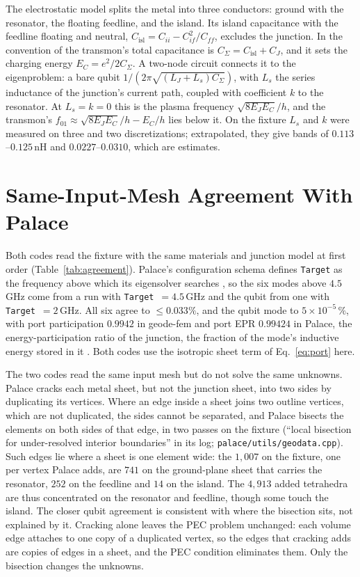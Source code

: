 \documentclass{anvil-paper}
\newcommand{\Cisl}{C_{\mathrm{isl}}}
\begin{document}
The electrostatic model splits the metal into three conductors: ground
with the resonator, the floating feedline, and the island. Its island
capacitance with the feedline floating and neutral,
$\Cisl = C_{ii} - C_{if}^2/C_{ff}$, excludes the junction. In the
convention of \citet{koch2007charge} the transmon's total capacitance is
$C_\Sigma = \Cisl + C_J$, and it sets the charging energy $E_C =
e^2/2C_\Sigma$. A two-node circuit connects it to the eigenproblem: a bare
qubit $1/(2\pi\sqrt{(L_J + L_s)C_\Sigma})$, with $L_s$ the series
inductance of the junction's current path, coupled with coefficient $k$
to the resonator. At $L_s = k = 0$ this is the plasma frequency
$\sqrt{8E_JE_C}/h$, and the transmon's $f_{01} \approx \sqrt{8E_JE_C}/h -
E_C/h$ lies below it. On the fixture $L_s$ and $k$ were measured on three and
two discretizations; extrapolated, they give bands of $0.113$--$0.125$\,nH
and $0.0227$--$0.0310$, which are estimates.

\section{Same-Input-Mesh Agreement With Palace}
\label{sec:agreement}

Both codes read the fixture with the same materials and junction model at
first order (Table~\ref{tab:agreement}). Palace's configuration schema
defines \texttt{Target} as the frequency above which its eigensolver
searches \citep{palace}, so the six modes above $4.5$\,GHz come from a run
with \texttt{Target}~$=4.5$\,GHz and the qubit from one with
\texttt{Target}~$=2$\,GHz. All six agree to $\leq 0.033\%$, and the qubit mode to $5\times10^{-5}\,\%$, with port
participation $0.9942$ in geode-fem and port EPR $0.99424$ in Palace, the
energy-participation ratio of the junction, the fraction of the mode's
inductive energy stored in it \citep{minev2021energy}. Both codes use the
isotropic sheet term of Eq.~\eqref{eq:port} here.

The two codes read the same input mesh but do not solve the same unknowns.
Palace cracks each metal sheet, but not the junction sheet, into two sides
by duplicating its vertices. Where an edge inside a sheet joins two outline
vertices, which are not duplicated, the sides cannot be separated, and
Palace bisects the elements on both sides of that edge, in two passes on
the fixture (``local bisection
for under-resolved interior boundaries'' in its log;
\texttt{palace/utils/geodata.cpp}). Such edges lie where a sheet is one
element wide: the $1{,}007$ on the fixture, one per vertex Palace adds, are
$741$ on the ground-plane sheet that carries the resonator, $252$ on the
feedline and $14$ on the island. The $4{,}913$ added tetrahedra are thus
concentrated on the resonator and feedline, though some touch the island.
The closer qubit agreement is consistent with where the bisection sits,
not explained by it. Cracking alone leaves the PEC problem unchanged: each
volume edge attaches to one copy of a duplicated vertex, so the edges that
cracking adds are copies of edges in a sheet, and the PEC condition
eliminates them. Only the bisection changes the unknowns.
\end{document}
